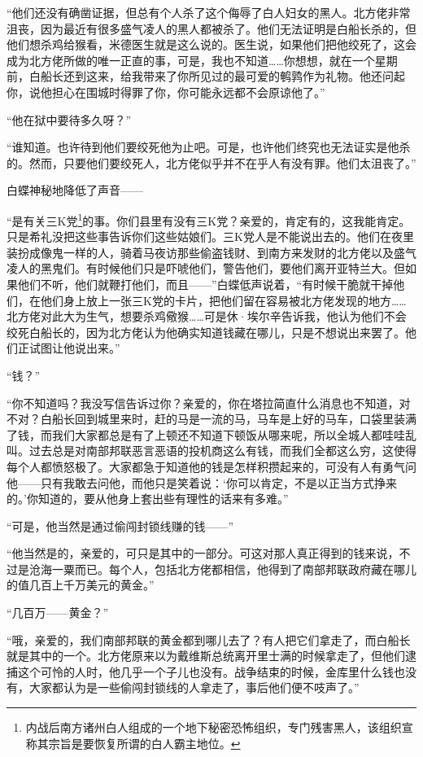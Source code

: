 \par “他们还没有确凿证据，但总有个人杀了这个侮辱了白人妇女的黑人。北方佬非常沮丧，因为最近有很多盛气凌人的黑人都被杀了。他们无法证明是白船长杀的，但他们想杀鸡给猴看，米德医生就是这么说的。医生说，如果他们把他绞死了，这会成为北方佬所做的唯一正直的事，可是，我也不知道……你想想，就在一个星期前，白船长还到这来，给我带来了你所见过的最可爱的鹌鹑作为礼物。他还问起你，说他担心在围城时得罪了你，你可能永远都不会原谅他了。”
\par “他在狱中要待多久呀？”
\par “谁知道。也许待到他们要绞死他为止吧。可是，也许他们终究也无法证实是他杀的。然而，只要他们要绞死人，北方佬似乎并不在乎人有没有罪。他们太沮丧了。”
\par 白蝶神秘地降低了声音——
\par “是有关三K党\footnote{内战后南方诸州白人组成的一个地下秘密恐怖组织，专门残害黑人，该组织宣称其宗旨是要恢复所谓的白人霸主地位。}的事。你们县里有没有三K党？亲爱的，肯定有的，这我能肯定。只是希礼没把这些事告诉你们这些姑娘们。三K党人是不能说出去的。他们在夜里装扮成像鬼一样的人，骑着马夜访那些偷盗钱财、到南方来发财的北方佬以及盛气凌人的黑鬼们。有时候他们只是吓唬他们，警告他们，要他们离开亚特兰大。但如果他们不听，他们就鞭打他们，而且——”白蝶低声说着，“有时候干脆就干掉他们，在他们身上放上一张三K党的卡片，把他们留在容易被北方佬发现的地方……北方佬对此大为生气，想要杀鸡儆猴……可是休·埃尔辛告诉我，他认为他们不会绞死白船长的，因为北方佬认为他确实知道钱藏在哪儿，只是不想说出来罢了。他们正试图让他说出来。”
\par “钱？”
\par “你不知道吗？我没写信告诉过你？亲爱的，你在塔拉简直什么消息也不知道，对不对？白船长回到城里来时，赶的马是一流的马，马车是上好的马车，口袋里装满了钱，而我们大家都总是有了上顿还不知道下顿饭从哪来呢，所以全城人都哇哇乱叫。过去总是对南部邦联恶言恶语的投机商这么有钱，而我们全都这么穷，这使得每个人都愤怒极了。大家都急于知道他的钱是怎样积攒起来的，可没有人有勇气问他——只有我敢去问他，而他只是笑着说：‘你可以肯定，不是以正当方式挣来的。’你知道的，要从他身上套出些有理性的话来有多难。”
\par “可是，他当然是通过偷闯封锁线赚的钱——”
\par “他当然是的，亲爱的，可只是其中的一部分。可这对那人真正得到的钱来说，不过是沧海一粟而已。每个人，包括北方佬都相信，他得到了南部邦联政府藏在哪儿的值几百上千万美元的黄金。”
\par “几百万——黄金？”
\par “哦，亲爱的，我们南部邦联的黄金都到哪儿去了？有人把它们拿走了，而白船长就是其中的一个。北方佬原来以为戴维斯总统离开里士满的时候拿走了，但他们逮捕这个可怜的人时，他几乎一个子儿也没有。战争结束的时候，金库里什么钱也没有，大家都认为是一些偷闯封锁线的人拿走了，事后他们便不吱声了。”
